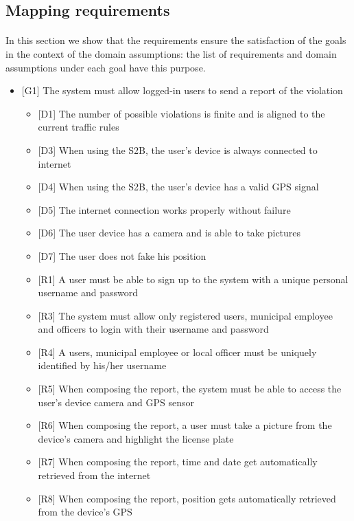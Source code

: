 				\subsection{Mapping requirements}
					\paragraph{}
						In this section we show that the requirements ensure the satisfaction of the goals in the context of the domain assumptions: the list of requirements and domain assumptions under each goal have this purpose.
					\begin{itemize}
						\item {[G1]} The system must allow logged-in users to send a report of the violation 
							\begin{itemize}
								\item {[D1]} The number of possible violations is finite and is aligned to the current traffic rules
								\item {[D3]} When using the S2B, the user's device is always connected to internet
								\item {[D4]} When using the S2B, the user's device has a valid GPS signal
								\item {[D5]} The internet connection works properly without failure
								\item {[D6]} The user device has a camera and is able to take pictures
								\item {[D7]} The user does not fake his position
								\item {[R1]} A user must be able to sign up to the system with a unique personal username and password
								\item {[R3]} The system must allow only registered users, municipal employee and officers to login with their username and password
								\item {[R4]} A users, municipal employee or local officer must be uniquely identified by his/her username
								\item {[R5]} When composing the report, the system must be able to access the user's device camera and GPS sensor
								\item {[R6]} When composing the report, a user must take a picture from the device's camera and highlight the license plate
								\item {[R7]} When composing the report, time and date get automatically retrieved from the internet 
								\item {[R8]} When composing the report, position gets automatically retrieved from the device's GPS

\end{itemize}
\end{itemize}
